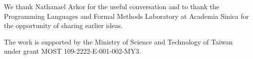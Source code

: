 \documentclass[acmsmall,screen]{acmart}
\theoremstyle{acmdefinition}
\begin{document}

\maketitle









\begin{acks}
We thank Nathanael Arkor for the useful conversation and to thank the Programming Languages and Formal Methods Laboratory at Academia Sinica for the opportunity of sharing earlier ideas.

The work is supported by the Ministry of Science and Technology of Taiwan under grant MOST 109-2222-E-001-002-MY3.
\end{acks}



\end{document}

